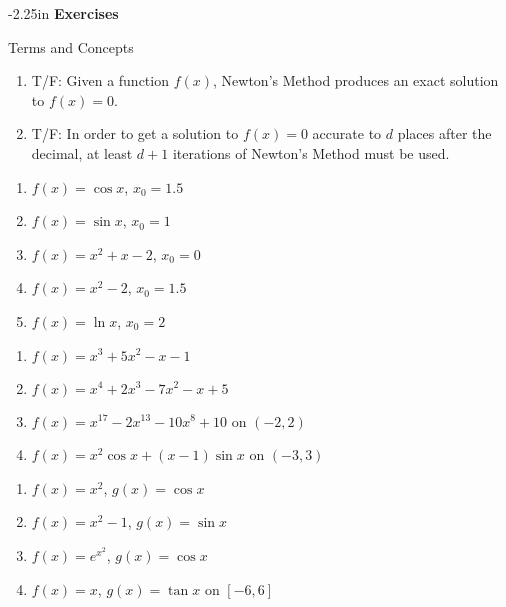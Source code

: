 \begin{adjustwidth*}{}{-2.25in}
\textbf{{\large Exercises}}
\setlength{\columnsep}{25pt}
\begin{multicols*}{2}
\noindent Terms and Concepts \small
\begin{enumerate}[1)]
\item T/F: Given a function $f(x)$, Newton's Method produces an exact solution to $f(x) = 0$.
\item T/F: In order to get a solution to $f(x)=0$ accurate to $d$ places after the decimal, at least $d+1$ iterations of Newton's Method must be used.
\end{enumerate} 

 \small


\begin{enumerate}[1),resume]
\item $f(x) = \cos x$, $x_0=1.5$
\item $f(x) = \sin x$, $x_0=1$
\item $f(x) = x^2+x-2$, $x_0=0$
\item $f(x) = x^2-2$, $x_0=1.5$
\item $f(x) = \ln x$, $x_0=2$
\end{enumerate}


\begin{enumerate}[1),resume]
\item $f(x) = x^3+5x^2-x-1$
\item $f(x) = x^4+2x^3-7x^2-x+5$
\item $f(x) = x^{17}-2x^{13}-10x^8+10$ on $(-2,2)$
\item $f(x) = x^2\cos x + (x-1)\sin x$ on $(-3,3)$
\end{enumerate}


\begin{enumerate}[1),resume]
\item $f(x) = x^2$, $g(x) = \cos x$
\item $f(x) = x^2-1$, $g(x) = \sin x$
\item $f(x) = e^{x^2}$, $g(x) = \cos x$
\item $f(x) = x$, $g(x) = \tan x$ on $[-6,6]$


\end{enumerate}
\end{multicols*}
\end{adjustwidth*}
